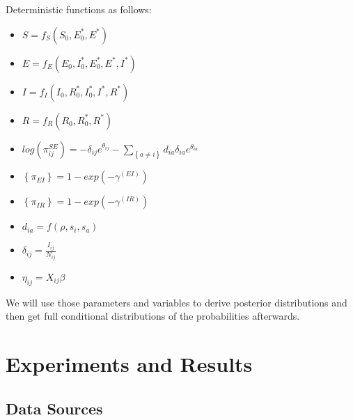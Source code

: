 \documentclass[11pt]{article}
\newcommand \mbreak {\\ \vspace{0.1in}}
\begin{document}
Deterministic functions as follows: 
\\
\begin{itemize}
\item $S = f_S(S_0, E^*_0, E^*)$ \\

\item $E = f_E(E_0, I^*_0, E^*_0, E^*, I^*)$ \\

\item $I = f_I(I_0, R^*_0, I^*_0, I^*, R^*)$ \\

\item $R = f_R(R_0, R^*_0, R^*)$ \\

\item $\displaystyle log(\pi^{SE}_{ij}) = -\delta_{ij}e^{\theta_{ij}} - \sum_{\left\{ a \ne i \right\}}d_{ia}\delta_{ia}e^{\theta_{ia}}$\\

\item $\left\{\pi_{EI}  \right\} = 1-exp({-\gamma^{(EI)}})$\\

\item $\left\{\pi_{IR}  \right\} = 1-exp({-\gamma^{(IR)}})$\\

\item $d_{ia} = f(\rho, s_i, s_a)$\\

\item $\delta_{ij} = \frac{I_{ij}}{N_{ij}}$ \\

\item $\eta_{ij} = X_{ij}\beta$\mbreak

\end{itemize}

We will use those parameters and variables to derive posterior distributions and then get full conditional distributions of the probabilities afterwards. 



\section{Experiments and Results}

\subsection{Data Sources}
\end{document}
